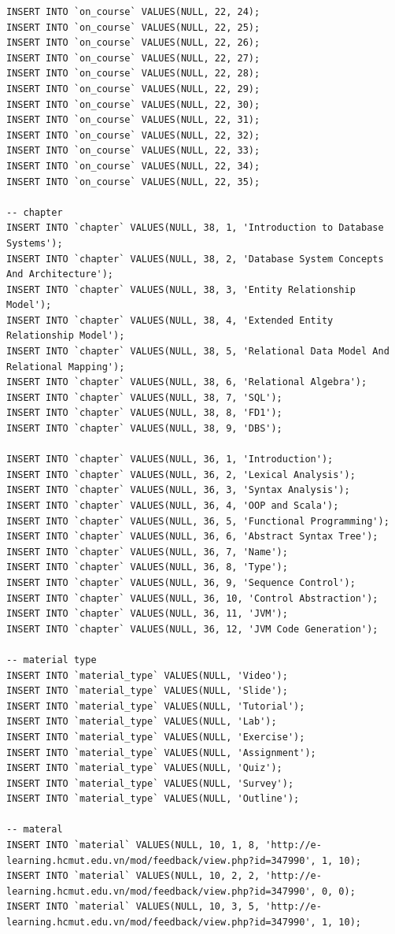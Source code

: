 \documentclass[12pt,a4paper,titlepage]{article}
\begin{document}
\begin{lstlisting}
INSERT INTO `on_course` VALUES(NULL, 22, 24);
INSERT INTO `on_course` VALUES(NULL, 22, 25);
INSERT INTO `on_course` VALUES(NULL, 22, 26);
INSERT INTO `on_course` VALUES(NULL, 22, 27);
INSERT INTO `on_course` VALUES(NULL, 22, 28);
INSERT INTO `on_course` VALUES(NULL, 22, 29);
INSERT INTO `on_course` VALUES(NULL, 22, 30);
INSERT INTO `on_course` VALUES(NULL, 22, 31);
INSERT INTO `on_course` VALUES(NULL, 22, 32);
INSERT INTO `on_course` VALUES(NULL, 22, 33);
INSERT INTO `on_course` VALUES(NULL, 22, 34);
INSERT INTO `on_course` VALUES(NULL, 22, 35);

-- chapter
INSERT INTO `chapter` VALUES(NULL, 38, 1, 'Introduction to Database Systems');
INSERT INTO `chapter` VALUES(NULL, 38, 2, 'Database System Concepts And Architecture');
INSERT INTO `chapter` VALUES(NULL, 38, 3, 'Entity Relationship Model');
INSERT INTO `chapter` VALUES(NULL, 38, 4, 'Extended Entity Relationship Model');
INSERT INTO `chapter` VALUES(NULL, 38, 5, 'Relational Data Model And Relational Mapping');
INSERT INTO `chapter` VALUES(NULL, 38, 6, 'Relational Algebra');
INSERT INTO `chapter` VALUES(NULL, 38, 7, 'SQL');
INSERT INTO `chapter` VALUES(NULL, 38, 8, 'FD1');
INSERT INTO `chapter` VALUES(NULL, 38, 9, 'DBS');

INSERT INTO `chapter` VALUES(NULL, 36, 1, 'Introduction');
INSERT INTO `chapter` VALUES(NULL, 36, 2, 'Lexical Analysis');
INSERT INTO `chapter` VALUES(NULL, 36, 3, 'Syntax Analysis');
INSERT INTO `chapter` VALUES(NULL, 36, 4, 'OOP and Scala');
INSERT INTO `chapter` VALUES(NULL, 36, 5, 'Functional Programming');
INSERT INTO `chapter` VALUES(NULL, 36, 6, 'Abstract Syntax Tree');
INSERT INTO `chapter` VALUES(NULL, 36, 7, 'Name');
INSERT INTO `chapter` VALUES(NULL, 36, 8, 'Type');
INSERT INTO `chapter` VALUES(NULL, 36, 9, 'Sequence Control');
INSERT INTO `chapter` VALUES(NULL, 36, 10, 'Control Abstraction');
INSERT INTO `chapter` VALUES(NULL, 36, 11, 'JVM');
INSERT INTO `chapter` VALUES(NULL, 36, 12, 'JVM Code Generation');

-- material type
INSERT INTO `material_type` VALUES(NULL, 'Video');
INSERT INTO `material_type` VALUES(NULL, 'Slide');
INSERT INTO `material_type` VALUES(NULL, 'Tutorial');
INSERT INTO `material_type` VALUES(NULL, 'Lab');
INSERT INTO `material_type` VALUES(NULL, 'Exercise');
INSERT INTO `material_type` VALUES(NULL, 'Assignment');
INSERT INTO `material_type` VALUES(NULL, 'Quiz');
INSERT INTO `material_type` VALUES(NULL, 'Survey');
INSERT INTO `material_type` VALUES(NULL, 'Outline');

-- materal
INSERT INTO `material` VALUES(NULL, 10, 1, 8, 'http://e-learning.hcmut.edu.vn/mod/feedback/view.php?id=347990', 1, 10);
INSERT INTO `material` VALUES(NULL, 10, 2, 2, 'http://e-learning.hcmut.edu.vn/mod/feedback/view.php?id=347990', 0, 0);
INSERT INTO `material` VALUES(NULL, 10, 3, 5, 'http://e-learning.hcmut.edu.vn/mod/feedback/view.php?id=347990', 1, 10);


\end{lstlisting}
\end{document}
